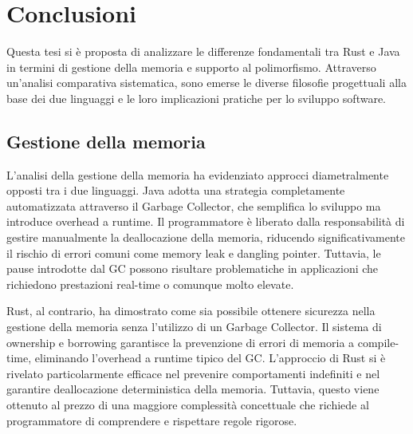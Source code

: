 
\chapter{Conclusioni}
\begin{comment}
    They say that the conclusions are the shortened version of the introduction, and while the Introduction uses future verbs (we will), the conclusions use the past verbs (we did). It is basically true.

In the conclusions, you might also mention the shortcomings of the present work and outline what are the likely, necessary, extension of it.
E.g., we did analyse the performance of this network assuming that all the users are pedestrians, but it would be interesting to include in the study also the ones using bicycles or skateboards.

Finally, you are strongly encouraged to carefully spell check your text, also using automatic tools (like, e.g., Grammarly\footnote{\url{https://www.grammarly.com/}} for English language).
\end{comment}

Questa tesi si è proposta di analizzare le differenze fondamentali tra Rust e Java in termini di gestione della memoria e supporto al polimorfismo. Attraverso un'analisi comparativa sistematica, sono emerse le diverse filosofie progettuali alla base dei due linguaggi e le loro implicazioni pratiche per lo sviluppo software.

\section{Gestione della memoria}
L'analisi della gestione della memoria ha evidenziato approcci diametralmente opposti tra i due linguaggi. Java adotta una strategia completamente automatizzata attraverso il Garbage Collector, che semplifica lo sviluppo ma introduce overhead a runtime. Il programmatore è liberato dalla responsabilità di gestire manualmente la deallocazione della memoria, riducendo significativamente il rischio di errori comuni come memory leak e dangling pointer. Tuttavia, le pause introdotte dal GC possono risultare problematiche in applicazioni che richiedono prestazioni real-time o comunque molto elevate.

Rust, al contrario, ha dimostrato come sia possibile ottenere sicurezza nella gestione della memoria senza l'utilizzo di un Garbage Collector. Il sistema di ownership e borrowing garantisce la prevenzione di errori di memoria a compile-time, eliminando l'overhead a runtime tipico del GC. L'approccio di Rust si è rivelato particolarmente efficace nel prevenire comportamenti indefiniti e nel garantire deallocazione deterministica della memoria. Tuttavia, questo viene ottenuto al prezzo di una maggiore complessità concettuale che richiede al programmatore di comprendere e rispettare regole rigorose.

